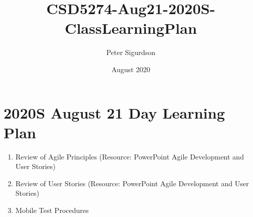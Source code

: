 \documentclass{article}
\title{CSD5274-Aug21-2020S-ClassLearningPlan}
\author{Peter Sigurdson }
\date{August 2020}
\begin{document}
\maketitle

\section{2020S August 21  Day Learning Plan}
\begin{enumerate}
    \item Review of Agile Principles  (Resource: PowerPoint Agile Development and User Stories)
    \item Review of User Stories      (Resource: PowerPoint Agile Development and User Stories)
    \item Mobile Test Procedures
\end{enumerate}


\end{document}
